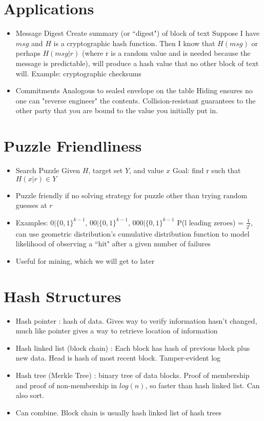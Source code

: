 \documentclass{article}
\begin{document}
\section*{Applications}
\begin{itemize}
\item Message Digest
\subitem Create summary (or ``digest") of block of text
\subitem Suppose I have $msg$ and $H$ is a cryptographic hash function. Then I know that $H(msg)$ or perhaps $H(msg|r)$ (where r is a random value and is needed because the message is predictable), will produce a hash value that no other block of text will.
\subitem Example: cryptographic checksums
\item Commitments
\subitem Analogous to sealed envelope on the table
\subitem Hiding ensures no one can "reverse engineer" the contents. Collision-resistant guarantees to the other party that you are bound to the value you initially put in.
\end{itemize}

\section*{Puzzle Friendliness}
\begin{itemize}
\item Search Puzzle
\subitem Given $H$, target set $Y$, and value $x$
\subitem Goal: find r such that $H(x|r) \in Y$
\item Puzzle friendly if no solving strategy for puzzle other than trying random guesses at $r$
\item Examples: $0|\{0,1\}^{k-1}$, $00|\{0,1\}^{k-1}$, $000|\{0,1\}^{k-1}$
\subitem P(l leading zeroes) = $\frac{1}{2^l}$, can use geometric distribution's cumulative distribution function to model likelihood of observing a ``hit" after a given number of failures
\item Useful for mining, which we will get to later
\end{itemize}

\section*{Hash Structures}
\begin{itemize}
\item Hash pointer : hash of data. Gives way to verify information hasn't changed, much like pointer gives a way to retrieve location of information
\item Hash linked list (block chain) : Each block has hash of previous block plus new data. Head is hash of most recent block.
\subitem Tamper-evident log
\item Hash tree (Merkle Tree) : binary tree of data blocks. Proof of membership and proof of non-membership in $log(n)$, so faster than hash linked list. Can also sort.
\item Can combine. Block chain is usually hash linked list of hash trees 
\end{itemize}
\end{document}
